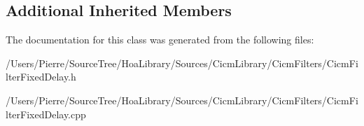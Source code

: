 \subsection*{Additional Inherited Members}


The documentation for this class was generated from the following files\-:\begin{DoxyCompactItemize}
\item 
/\-Users/\-Pierre/\-Source\-Tree/\-Hoa\-Library/\-Sources/\-Cicm\-Library/\-Cicm\-Filters/Cicm\-Filter\-Fixed\-Delay.\-h\item 
/\-Users/\-Pierre/\-Source\-Tree/\-Hoa\-Library/\-Sources/\-Cicm\-Library/\-Cicm\-Filters/Cicm\-Filter\-Fixed\-Delay.\-cpp\end{DoxyCompactItemize}
